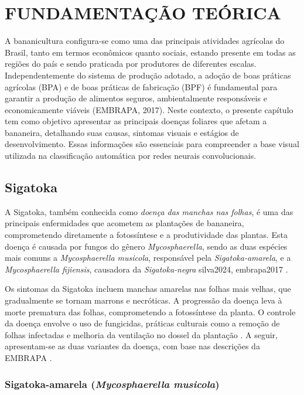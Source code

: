 \chapter{FUNDAMENTAÇÃO TEÓRICA}{}
\label{cap:03}

A bananicultura configura-se como uma das principais atividades agrícolas do Brasil, tanto em termos econômicos quanto sociais, estando presente em todas as regiões do país e sendo praticada por produtores de diferentes escalas. Independentemente do sistema de produção adotado, a adoção de boas práticas agrícolas (BPA) e de boas práticas de fabricação (BPF) é fundamental para garantir a produção de alimentos seguros, ambientalmente responsáveis e economicamente viáveis (EMBRAPA, 2017).
Neste contexto, o presente capítulo tem como objetivo apresentar as principais doenças foliares que afetam a bananeira, detalhando suas causas, sintomas visuais e estágios de desenvolvimento. Essas informações são essenciais para compreender a base visual utilizada na classificação automática por redes neurais convolucionais.

\section{Sigatoka}

A Sigatoka, também conhecida como \textit{doença das manchas nas folhas}, é uma das principais enfermidades que acometem as plantações de bananeira, comprometendo diretamente a fotossíntese e a produtividade das plantas. Esta doença é causada por fungos do gênero \textit{Mycosphaerella}, sendo as duas espécies mais comuns a \textit{Mycosphaerella musicola}, responsável pela \textit{Sigatoka-amarela}, e a \textit{Mycosphaerella fijiensis}, causadora da \textit{Sigatoka-negra} silva2024, embrapa2017\textbf{} \cite{silva2024, embrapa2017}.

Os sintomas da Sigatoka incluem manchas amarelas nas folhas mais velhas, que gradualmente se tornam marrons e necróticas. A progressão da doença leva à morte prematura das folhas, comprometendo a fotossíntese da planta. O controle da doença envolve o uso de fungicidas, práticas culturais como a remoção de folhas infectadas e melhoria da ventilação no dossel da plantação \cite{rezende2020}. A seguir, apresentam-se as duas variantes da doença, com base nas descrições da EMBRAPA \cite{embrapa2017}.

\subsection{Sigatoka-amarela (\textit{Mycosphaerella musicola})}

